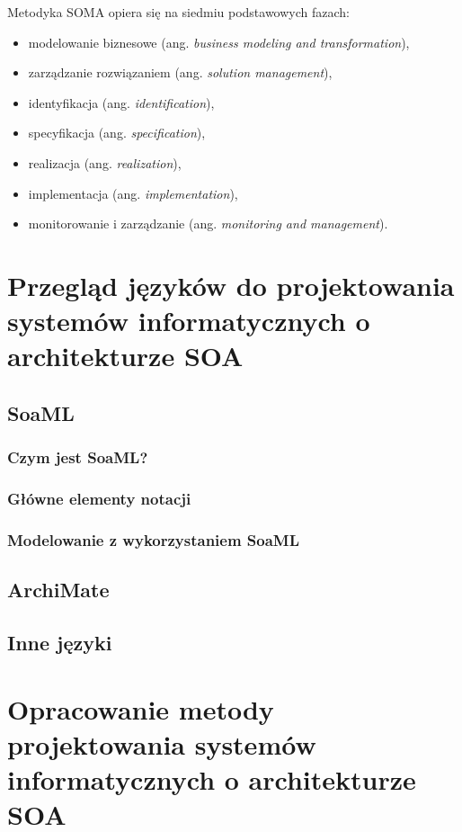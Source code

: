 Metodyka SOMA opiera się na siedmiu podstawowych fazach:
\begin{itemize}
\item{modelowanie biznesowe (ang. \textit{business modeling and transformation}),}
\item{zarządzanie rozwiązaniem (ang. \textit{solution management}),}
\item{identyfikacja (ang. \textit{identification}),}
\item{specyfikacja (ang. \textit{specification}),}
\item{realizacja (ang. \textit{realization}),}
\item{implementacja (ang. \textit{implementation}),}
\item{monitorowanie i zarządzanie (ang. \textit{monitoring and management}).}
\end{itemize}



\chapter{Przegląd języków do projektowania systemów informatycznych o architekturze SOA}
\section{SoaML}
\subsection{Czym jest SoaML?}
\subsection{Główne elementy notacji}
\subsection{Modelowanie z wykorzystaniem SoaML}
\section{ArchiMate}
\section{Inne języki}

\chapter{Opracowanie metody projektowania systemów informatycznych o architekturze SOA}

